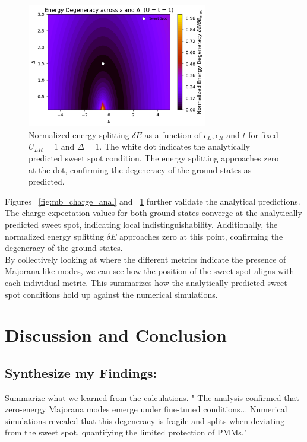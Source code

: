 \documentclass[11pt, letterpaper, titlepage]{article}
\begin{document}
\begin{figure}
  \centering
  \includegraphics[width=0.7\textwidth]{../Figures/degen_anal.png}
  \caption{Normalized energy splitting $\delta E$ as a function of $ϵ_L,ϵ_R$ and $t$ for fixed $U_{LR} = 1$ and $Δ = 1$. The white dot indicates the analytically predicted sweet spot condition. The energy splitting approaches zero at the dot, confirming the degeneracy of the ground states as predicted.}
  \label{fig:mb_deltaE_anal}
\end{figure}
Figures ~\ref{fig:mb_charge_anal} and ~\ref{fig:mb_deltaE_anal} further validate the analytical predictions. The charge expectation values for both ground states converge at the analytically predicted sweet spot, indicating local indistinguishability. Additionally, the normalized energy splitting $\delta E$ approaches zero at this point, confirming the degeneracy of the ground states.\\
By collectively looking at where the different metrics indicate the presence of Majorana-like modes, we can see how the position of the sweet spot aligns with each individual metric. This summarizes how the analytically predicted sweet spot conditions hold up against the numerical simulations.
\newpage

\section{Discussion and Conclusion}
\subsection{Synthesize my Findings:} Summarize what we learned from the calculations. " The analysis confirmed that zero-energy Majorana modes emerge under fine-tuned conditions... Numerical simulations revealed that this degeneracy is fragile and splits when deviating from the sweet spot, quantifying the limited protection of PMMs."\par
\end{document}
